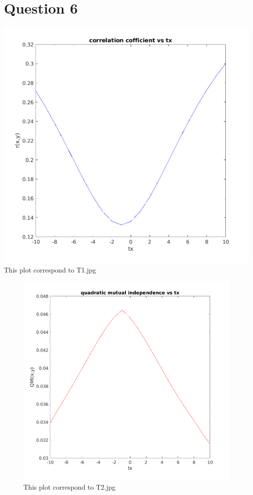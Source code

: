 \documentclass{article}
\theoremstyle{remark}
\begin{document}
\section{Question 6}
\includegraphics[width=\textwidth, height=\textheight, keepaspectratio]{cor_cof1.png}
 {This plot correspond to T1.jpg}

\begin{figure}[h!]
    \includegraphics[width=\textwidth, height=\textheight, keepaspectratio]{quadMutInf1.png}
    \caption{This plot correspond to T2.jpg}
\end{figure}
\end{document}
